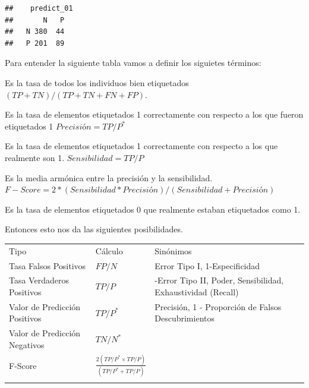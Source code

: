 \documentclass[
  12pt,
]{book}
\providecommand{\tightlist}{%
  \setlength{\itemsep}{0pt}\setlength{\parskip}{0pt}}
\theoremstyle{definition}
\theoremstyle{definition}
\theoremstyle{definition}
\theoremstyle{remark}
\begin{document}
\begin{verbatim}
##    predict_01
##       N   P
##   N 380  44
##   P 201  89
\end{verbatim}

Para entender la siguiente tabla vamos a definir los siguietes términos:

\begin{description}
\tightlist
\item[Exactitud (Accuracy)]
Es la tasa de todos los individuos bien etiquetados \((TP+TN)/(TP+TN+FN+FP)\).
\item[Precisión]
Es la tasa de elementos etiquetados 1 correctamente con respecto a los que fueron etiquetados 1 \(Precisión = TP/P^*\)
\item[Sensibilidad (Exhaustividad)]
Es la tasa de elementos etiquetados 1 correctamente con respecto a los que realmente son 1. \(Sensibilidad = TP/P\)
\item[F-Score]
Es la media armónica entre la precisión y la sensibilidad. \(F-Score = 2*(Sensibilidad * Precisión)/(Sensibilidad + Precisión)\)
\item[Especificidad]
Es la tasa de elementos etiquetados 0 que realmente estaban etiquetados como 1.
\end{description}

Entonces esto nos da las siguientes posibilidades.

\begin{longtable}[]{@{}
  >{\raggedright\arraybackslash}p{}
  >{\raggedright\arraybackslash}p{}
  >{\raggedright\arraybackslash}p{}@{}}
\toprule
Tipo & Cálculo & Sinónimos \\ \addlinespace
\midrule
\endhead
Tasa Falsos Positivos & \(FP/N\) & Error Tipo I, 1-Especificidad \\ \addlinespace
Tasa Verdaderos Positivos & \(TP/P\) & 1-Error Tipo II, Poder, Sensibilidad, Exhaustividad (Recall) \\ \addlinespace
Valor de Predicción Positivos & \(TP/P^{*}\) & Precisión, 1 - Proporción de Falsos Descubrimientos \\ \addlinespace
Valor de Predicción Negativos & \(TN/N^{*}\) & \\ \addlinespace
F-Score & \(\frac{2(TP/P^{*} \times TP/P )}{(TP/P^{*} + TP/P )}\) & \\ \addlinespace
\bottomrule
\end{longtable}
\end{document}
